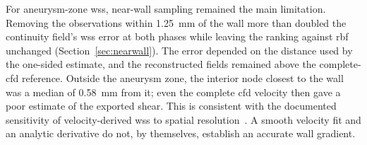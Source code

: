 \documentclass[12pt,a4paper]{article}
\newcommand{\CFD}{\ac{cfd}\xspace}
\newcommand{\WSS}{\ac{wss}\xspace}
\newcommand{\RBF}{\ac{rbf}\xspace}
\theoremstyle{definition}
\numberwithin{equation}{section}
\begin{document}
For aneurysm-zone \WSS, near-wall sampling remained the main limitation. Removing the observations within 1.25~mm of the wall more than doubled the continuity field's \WSS error at both phases while leaving the ranking against \RBF unchanged (Section~\ref{sec:nearwall}). The error depended on the distance used by the one-sided estimate, and the reconstructed fields remained above the complete-\CFD reference. Outside the aneurysm zone, the interior node closest to the wall was a median of 0.58~mm from it; even the complete \CFD velocity then gave a poor estimate of the exported shear. This is consistent with the documented sensitivity of velocity-derived \WSS to spatial resolution~\cite{petersson2012assessment,stalder2008quantitative}. A smooth velocity fit and an analytic derivative do not, by themselves, establish an accurate wall gradient.
\end{document}
